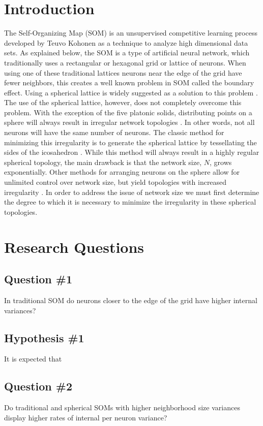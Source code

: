 \documentclass[10pt,titlepage]{article}
\begin{document}
\section{Introduction}
The Self-Organizing Map (SOM) is an unsupervised competitive learning process
developed by Teuvo Kohonen as a technique to analyze high dimensional data sets.
As explained below, the SOM is a type of artificial neural network, which
traditionally uses a rectangular or hexagonal grid or lattice of neurons.  When
using one of these traditional lattices neurons near the edge of the grid have
fewer neighbors, this creates a well known problem in SOM called the boundary
effect. Using a spherical lattice is widely suggested as a solution to this problem
\citep{ritter99, boudjemai2003, sangole03, wu2006, Nishio:2006fk}.  The
use of the spherical lattice, however, does not completely overcome this
problem.  With the exception of the five platonic solids, distributing points on
a sphere will always result in irregular network topologies \citep{ritter99,
harris2000}.  In other words, not all neurons will have the same number of
neurons.  The classic method for minimizing this irregularity is to generate
the spherical lattice by tessellating the sides of the icosahedron
\citep{Nishio:2006fk}.  While this method will always result in a highly regular
spherical topology, the main drawback is that the network size, \(N\), grows
exponentially. Other methods for arranging neurons on the sphere allow for
unlimited control over network size, but yield topologies with increased
irregularity \citep{harris2000, wu2005, Nishio:2006fk}.  In order to address the
issue of network size we must first determine the degree to which it is
necessary to minimize the irregularity in these spherical topologies.

\section{Research Questions}
\subsection{Question \#1}
In traditional SOM do neurons closer to the edge of the grid have higher
internal variances?
\subsection{Hypothesis \#1}
It is expected that 
\subsection{Question \#2}
Do traditional and spherical SOMs with higher neighborhood size variances 
display higher rates of internal per neuron variance?
\end{document}
